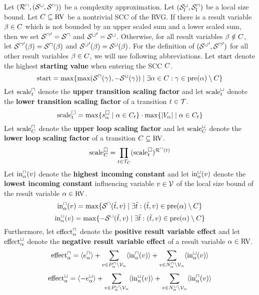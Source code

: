 \begin{theorem}
  Let $({\mathcal{R}^\sqcap}, {({\mathcal{S}^\sqcup}, {\mathcal{S}^\sqcap})})$ be a complexity approximation.
  Let ${({\mathcal{S}^\sqcup_l}, {\mathcal{S}^\sqcap_l})}$ be a local size bound.
  Let $C \subseteq \text{RV}$ be a nontrivial SCC of the RVG.
  If there is a result variable $\beta \in C$ which is not bounded by an upper scaled sum and a lower scaled sum, then we set ${\mathcal{S}^\sqcap}' = {\mathcal{S}^\sqcap}$ and ${\mathcal{S}^\sqcup}' = {\mathcal{S}^\sqcup}$.
  Otherwise, for all result variables $\beta \notin C$, let ${\mathcal{S}^\sqcap}'(\beta) = {\mathcal{S}^\sqcap}(\beta)$ and ${\mathcal{S}^\sqcup}'(\beta) = {\mathcal{S}^\sqcup}(\beta)$.
  For the definition of $({\mathcal{S}^\sqcup}', {\mathcal{S}^\sqcap}')$ for all other result variables $\beta \in C$, we will use following abbreviations.
  Let $\text{start}$ denote the highest \textbf{starting value} when entering the SCC $C$.
  \[ \text{start} = \max \lbrace \max({\mathcal{S}^\sqcap}(\gamma), -{\mathcal{S}^\sqcup}(\gamma)) \mid \exists \alpha \in C: \gamma \in \text{pre}(\alpha) \setminus C \rbrace \]
  Let $\text{scale}^\sqcap_t$ denote the \textbf{upper transition scaling factor} and let $\text{scale}^\sqcup_t$ denote the \textbf{lower transition scaling factor} of a transition $t \in \mathcal{T}$.
  \[ \text{scale}^\square_t = \max \lbrace s^\square_{\alpha} \mid \alpha \in C_t \rbrace \cdot \max \lbrace \left|V_\alpha\right| \mid \alpha \in C_t \rbrace \]
  Let $\text{scale}^\sqcap_C$ denote the \textbf{upper loop scaling factor} and let $\text{scale}^\sqcup_C$ denote the \textbf{lower loop scaling factor} of a transition $C \subseteq \text{RV}$.
  \[ \text{scale}^\square_C = \prod_{t \in \mathcal{T}_C} (\text{scale}^\square_t)^{{\mathcal{R}^\sqcap}(t)} \]
  Let $\text{in}^\sqcap_\alpha(v)$ denote the \textbf{highest incoming constant} and let $\text{in}^\sqcup_\alpha(v)$ denote the \textbf{lowest incoming constant} influencing variable $v \in \mathcal{V}$ of the local size bound of the result variable $\alpha \in \text{RV}$.
  \[ \text{in}^\sqcap_\alpha(v) = \max \lbrace {\mathcal{S}^\sqcap}(\tilde{t}, v) \mid \exists \tilde{t}: (\tilde{t}, v) \in \text{pre}(\alpha) \setminus C \rbrace \]
  \[ \text{in}^\sqcup_\alpha(v) = \max \lbrace -{\mathcal{S}^\sqcup}(\tilde{t}, v) \mid \exists \tilde{t}: (\tilde{t}, v) \in \text{pre}(\alpha) \setminus C \rbrace \]
  Furthermore, let $\text{effect}^\sqcap_\alpha$ denote the \textbf{positive result variable effect} and let $\text{effect}^\sqcup_\alpha$ denote the \textbf{negative result variable effect} of a result variable $\alpha \in \text{RV}$.
  \[ \text{effect}^\sqcap_\alpha = \langle e^{\sqcap}_\alpha\rangle + \sum_{v \in P_\alpha^\sqcap \setminus \mathcal{V}_\alpha} \langle\text{in}^\sqcap_\alpha(v)\rangle + \sum_{v \in N_\alpha^\sqcap \setminus \mathcal{V}_\alpha} \langle\text{in}^\sqcup_\alpha(v)\rangle \]
  \[ \text{effect}^\sqcup_\alpha = \langle-e^{\sqcup}_\alpha\rangle + \sum_{v \in P_\alpha^\sqcup \setminus \mathcal{V}_\alpha} \langle\text{in}^\sqcup_\alpha(v)\rangle + \sum_{v \in N_\alpha^\sqcup \setminus \mathcal{V}_\alpha} \langle\text{in}^\sqcap_\alpha(v)\rangle \]

\end{theorem}
